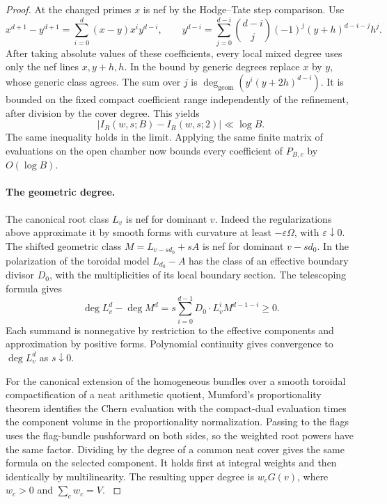 \begin{proof}
At the changed primes \(x\) is nef by the Hodge--Tate step
comparison. Use
\[
 x^{d+1}-y^{d+1}=\sum_{i=0}^d(x-y)x^i y^{d-i},\qquad
 y^{d-i}=\sum_{j=0}^{d-i}\binom{d-i}{j}(-1)^j
                                 (y+h)^{d-i-j}h^j .
\]
After taking absolute values of these coefficients, every
local mixed degree uses only the nef lines \(x,y+h,h\).
In the bound by generic degrees replace \(x\) by \(y\),
whose generic class agrees. The sum over \(j\) is
\(\deg_{\mathrm{geom}}(y^i(y+2h)^{d-i})\). It is bounded on the
fixed compact coefficient range independently of the refinement,
after division by the cover degree. This yields
\begin{equation}\label{eq:flag-wall-finite-cutoff}
 \lvert I_R(w,s;B)-I_R(w,s;2)\rvert\ll\log B .
\end{equation}
The same inequality holds in the limit. Applying the same finite matrix of evaluations on the open
chamber now bounds every coefficient of \(P_{B,c}\) by \(O(\log B)\).
\label{cor:flag-wall-polynomial-6}

\paragraph{The geometric degree.}
The canonical root class \(L_v\) is nef for dominant \(v\).
Indeed the regularizations above approximate it by smooth forms
with curvature at least \(-\varepsilon\Omega\), with
\(\varepsilon\downarrow0\). The shifted geometric class
\(M=L_{v-sd_0}+s A\) is nef for dominant \(v-sd_0\). In the
polarization of the toroidal model \(L_{d_0}-A\) has the class
of an effective boundary divisor \(D_0\), with the multiplicities
of its local boundary section. The telescoping formula gives
\[
  \deg L_v^d-\deg M^d
     =s\sum_{i=0}^{d-1} D_0\cdot L_v^i M^{d-1-i}\ge0 .
\]
Each summand is nonnegative by restriction to the effective
components and approximation by positive forms. Polynomial
continuity gives convergence to \(\deg L_v^d\) as \(s\downarrow0\).

For the canonical extension of the homogeneous bundles over a
smooth toroidal compactification of a neat arithmetic quotient,
Mumford's proportionality theorem identifies the Chern evaluation
with the compact-dual evaluation times the component volume in
the proportionality normalization. Passing to the flags uses the
flag-bundle pushforward on both sides, so the weighted root
powers have the same factor. Dividing by the degree of a common
neat cover gives the same formula on the selected component.
It holds first at integral weights and then identically by
multilinearity. The resulting upper degree is \(w_cG(v)\),
where \(w_c>0\) and \(\sum_c w_c=V\).
\cite{mumford-flag-wall}\label{cor:flag-wall-polynomial-7}
\end{proof}
